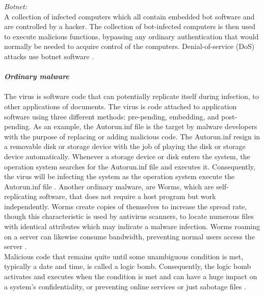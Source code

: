 \documentclass[12pt]{article} %
\begin{document}
\emph{Botnet:} \\
A collection of infected computers which all contain embedded bot software and are controlled by a hacker. The collection of bot-infected computers is then used to execute malicious functions, bypassing any ordinary authentication that would normally be needed to acquire control of the computers. Denial-of-service (DoS) attacks use botnet software \cite{Asurveyonmalware}.  
\\ \\
\textbf{\emph{Ordinary malware}}
\\ \\
The virus is software code that can potentially replicate itself during infection, to other applications of documents. The virus is code attached to application software using three different methods: pre-pending, embedding, and post-pending. As an example, the Autorun.inf file is the target by malware developers with the purpose of replacing or adding malicious code. The Autorun.inf resign in a removable disk or storage device with the job of playing the disk or storage device automatically. Whenever a storage device or disk enters the system, the operation system searches for the Autorun.inf file and executes it. Consequently, the virus will be infecting the system as the operation system execute the Autorun.inf file \cite{Asurveyonmalware}.  Another ordinary malware, are Worms, which are self-replicating software, that does not require a host program but work independently. Worms create copies of themselves to increase the spread rate, though this characteristic is used by antivirus scanners, to locate numerous files with identical attributes which may indicate a malware infection. Worms roaming on a server can likewise consume bandwidth, preventing normal users access the server \cite{Asurveyonmalware}. \\
Malicious code that remains quite until some unambiguous condition is met, typically a date and time, is called a logic bomb. Consequently, the logic bomb activates and executes when the condition is met and can have a huge impact on a system's confidentiality, or preventing online services or just sabotage files \cite{Asurveyonmalware}.  
\\
\end{document}
